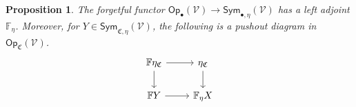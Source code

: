 \documentclass[a4paper,10pt
,draft
]{article}%
\numberwithin{equation}{section}
\numberwithin{figure}{section}
\newtheorem{proposition}[equation]{Proposition}%
\theoremstyle{definition} %
\newcommand{\Sym}{\ensuremath{\mathsf{Sym}}}%
\newcommand{\Op}{\mathsf{Op}}%
\newcommand{\V}{\ensuremath{\mathcal V}}
\newcommand{\1}{\ensuremath{\mathbbm 1}}%
\begin{document}
\begin{proposition}
      The forgetful functor $\Op_\bullet(\V) \to \Sym_{\bullet, \eta}(\V)$ has a left adjoint $\mathbb F_\eta$.
      Moreover, for $Y \in \Sym_{\mathfrak C, \eta}(\V)$,
      the following is a pushout diagram in $\Op_{\mathfrak C}(\V)$.
      \begin{equation}
            \label{FETA_EQ}
            \begin{tikzcd}
                  \mathbb F \eta_{\mathfrak C} \arrow[d] \arrow[r]
                  &
                  \eta_{\mathfrak C} \arrow[d]
                  \\
                  \mathbb F Y \arrow[r]
                  &
                  \mathbb F_{\eta} X
            \end{tikzcd}
      \end{equation}
\end{proposition}
\end{document}
